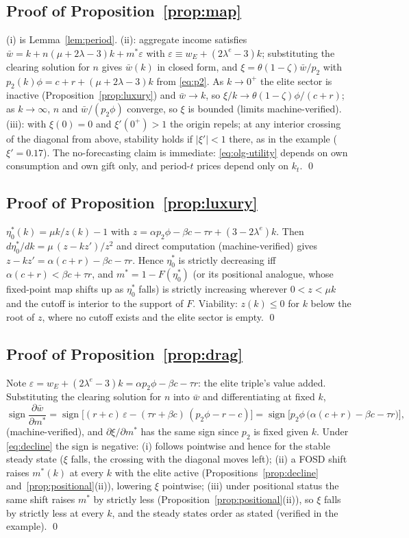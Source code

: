 \documentclass[12pt,letterpaper]{article}
\theoremstyle{definition}
\begin{document}
\subsection{Proof of Proposition~\ref{prop:map}} (i) is Lemma~\ref{lem:period}.
(ii): aggregate income satisfies $\bar{w} = k + n(\mu+2\lambda-3)k + m^\ast \varepsilon$ with $\varepsilon \equiv w_E+(2\lambda^{e}-3)k$; substituting the clearing solution for $n$ gives $\bar{w}(k)$ in closed form, and $\xi=\theta(1-\zeta)\bar{w}/p_2$ with $p_2(k)\phi=c+r+(\mu+2\lambda-3)k$ from \eqref{eq:p2}.
As $k\to 0^+$ the elite sector is inactive (Proposition~\ref{prop:luxury}) and $\bar{w}\to k$, so $\xi/k\to\theta(1-\zeta)\phi/(c+r)$; as $k\to\infty$, $n$ and $\bar{w}/(p_2\phi)$ converge, so $\xi$ is bounded (limits machine-verified).
(iii): with $\xi(0)=0$ and $\xi'(0^+)>1$ the origin repels; at any interior crossing of the diagonal from above, stability holds if $|\xi'|<1$ there, as in the example ($\xi'=0.17$).
The no-forecasting claim is immediate: \eqref{eq:olg-utility} depends on own consumption and own gift only, and period-$t$ prices depend only on $k_t$.
\qed

\subsection{Proof of Proposition~\ref{prop:luxury}} $\eta^\ast_0(k)=\mu k/z(k)-1$ with $z=\alpha p_2\phi-\beta c-\tau r+(3-2\lambda^{e})k$.
Then $d\eta^\ast_0/dk = \mu\,(z-kz')/z^2$ and direct computation (machine-verified) gives $z-kz' = \alpha(c+r)-\beta c-\tau r$.
Hence $\eta^\ast_0$ is strictly decreasing iff $\alpha(c+r)<\beta c+\tau r$, and $m^\ast=1-F(\eta^\ast_0)$ (or its positional analogue, whose fixed-point map shifts up as $\eta^\ast_0$ falls) is strictly increasing wherever $0<z<\mu k$ and the cutoff is interior to the support of $F$.
Viability: $z(k)\leq 0$ for $k$ below the root of $z$, where no cutoff exists and the elite sector is empty.
\qed

\subsection{Proof of Proposition~\ref{prop:drag}} Note $\varepsilon = w_E+(2\lambda^{e}-3)k = \alpha p_2\phi-\beta c-\tau r$: the elite triple's value added.
Substituting the clearing solution for $n$ into $\bar{w}$ and differentiating at fixed $k$, \[ \operatorname{sign}\frac{\partial \bar{w}}{\partial m^\ast} = \operatorname{sign}\Big[(r+c)\,\varepsilon - (\tau r+\beta c)\,(p_2\phi-r-c)\Big] = \operatorname{sign}\Big[p_2\phi\,\big(\alpha(c+r)-\beta c-\tau r\big)\Big], \] (machine-verified), and $\partial \xi/\partial m^\ast$ has the same sign since $p_2$ is fixed given $k$.
Under \eqref{eq:decline} the sign is negative: (i) follows pointwise and hence for the stable steady state ($\xi$ falls, the crossing with the diagonal moves left); (ii) a FOSD shift raises $m^\ast(k)$ at every $k$ with the elite active (Propositions~\ref{prop:decline} and~\ref{prop:positional}(ii)), lowering $\xi$ pointwise; (iii) under positional status the same shift raises $m^\ast$ by strictly less (Proposition~\ref{prop:positional}(ii)), so $\xi$ falls by strictly less at every $k$, and the steady states order as stated (verified in the example).
\qed
\end{document}
